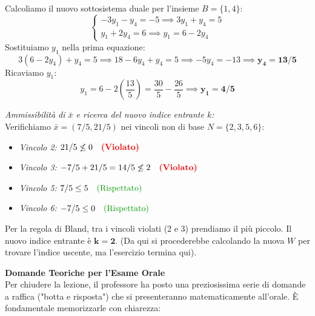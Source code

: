 \documentclass[12pt, a4paper]{article}
\newcommand{\separatore}{\noindent{\color{titlecolor!50}\rule{\textwidth}{0.6pt}}}
\begin{document}
	Calcoliamo il nuovo sottosistema duale per l'insieme $B=\{1, 4\}$:
	\[
	\begin{cases}
		-3y_1 - y_4 = -5 \implies 3y_1 + y_4 = 5 \\
		y_1 + 2y_4 = 6 \implies y_1 = 6 - 2y_4
	\end{cases}
	\]
	Sostituiamo $y_1$ nella prima equazione:
	\[
	3(6 - 2y_4) + y_4 = 5 \implies 18 - 6y_4 + y_4 = 5 \implies -5y_4 = -13 \implies \mathbf{y_4 = 13/5}
	\]
	Ricaviamo $y_1$:
	\[
	y_1 = 6 - 2\left(\frac{13}{5}\right) = \frac{30}{5} - \frac{26}{5} \implies \mathbf{y_1 = 4/5}
	\]
	
	\textit{Ammissibilità di $\bar{x}$ e ricerca del nuovo indice entrante $k$:}\\
	Verifichiamo $\bar{x} = (7/5, 21/5)$ nei vincoli non di base $N = \{2, 3, 5, 6\}$:
	\begin{itemize}[label=$\circ$, itemsep=2pt, leftmargin=1.5cm]
		\item \textit{Vincolo 2:} $21/5 \not\leq 0 \quad \text{\textcolor{red}{\textbf{(Violato)}}}$
		\item \textit{Vincolo 3:} $-7/5 + 21/5 = 14/5 \not\leq 2 \quad \text{\textcolor{red}{\textbf{(Violato)}}}$
		\item \textit{Vincolo 5:} $7/5 \leq 5 \quad \text{\textcolor{green!60!black}{(Rispettato)}}$
		\item \textit{Vincolo 6:} $-7/5 \leq 0 \quad \text{\textcolor{green!60!black}{(Rispettato)}}$
	\end{itemize}
	Per la regola di Bland, tra i vincoli violati (2 e 3) prendiamo il più piccolo. Il nuovo indice entrante è $\mathbf{k = 2}$. (Da qui si procederebbe calcolando la nuova $W$ per trovare l'indice uscente, ma l'esercizio termina qui).
	
	\vspace{0.6cm}
	\separatore
	\vspace{0.4cm}
	
	\textbf{Domande Teoriche per l'Esame Orale}\\
	Per chiudere la lezione, il professore ha posto una preziosissima serie di domande a raffica ("botta e risposta") che si presenteranno matematicamente all'orale. È fondamentale memorizzarle con chiarezza:
	
\end{document}
